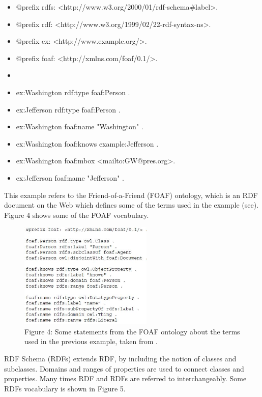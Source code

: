 \documentclass[10pt,journal,compsoc]{IEEEtran}
\begin{document}
\begin{itemize}
\item[]@prefix rdfs:  \textless http://www.w3.org/2000/01/rdf-schema\#label\textgreater .
\item[]@prefix rdf:  \textless http://www.w3.org/1999/02/22-rdf-syntax-ns\textgreater .
  \item[]@prefix ex:  \textless http://www.example.org/\textgreater .
  \item[]@prefix foaf:  \textless http://xmlns.com/foaf/0.1/\textgreater .
  \item[] 
  \item[] ex:Washington rdf:type foaf:Person .
 \item[] ex:Jefferson rdf:type foaf:Person .
 \item[] ex:Washington foaf:name "Washington" .
 \item[] ex:Washington foaf:knows example:Jefferson .
 \item[] ex:Washington foaf:mbox \textless mailto:GW@pres.org\textgreater .
 \item[] ex:Jefferson foaf:name "Jefferson" .
\end{itemize}


This example refers to the Friend-of-a-Friend (FOAF) ontology, which is an RDF document on the Web which defines some of the terms used in the example (see\cite{foaf}).  Figure 4 shows some of the FOAF vocabulary.


\begin{figure}[htbp] %
   \centering
   \includegraphics[width=2.5in]{StmtsFromFOAF.jpg} 
  \caption*{Figure 4: Some statements from the FOAF ontology about the terms used in the previous example, taken from \cite{_social_2007}.}
   \label{}
\label{}   
\end{figure}



RDF Schema (RDFs) extends RDF, by including the notion of classes and subclasses.  Domains and ranges of properties are used to connect classes and properties.  Many times RDF and RDFs are referred to interchangeably.  Some RDFs vocabulary is shown in Figure 5.
\end{document}
